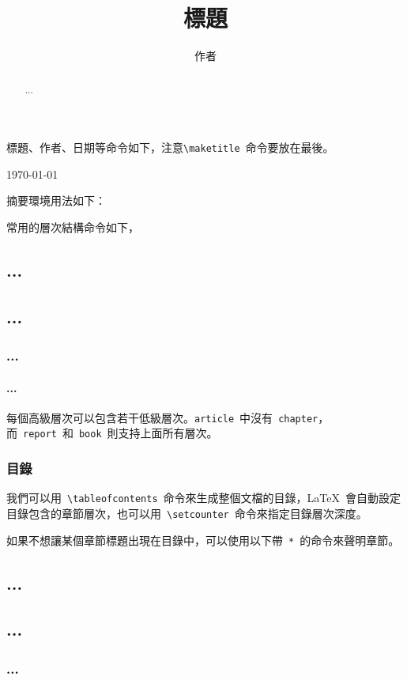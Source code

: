 標題、作者、日期等命令如下，注意\verb|\maketitle|~命令要放在最後。
\begin{code}
\title{標題}
\author{作者}
\today
\maketitle
\end{code}

摘要環境用法如下：
\begin{code}
\begin{abstract}
...
\end{abstract}
\end{code}

常用的層次結構命令如下，
\begin{code}
\chapter{...}
\section{...}
\subsection{...}
\subsubsection{...}
\end{code}

每個高級層次可以包含若干低級層次。\verb|article|~中沒有~\verb|chapter|，而~\verb|report|~和~\verb|book|~則支持上面所有層次。

\subsection{目錄}

我們可以用~\verb|\tableofcontents|~命令來生成整個文檔的目錄，\LaTeX~會自動設定目錄包含的章節層次，也可以用~\verb|\setcounter|~命令來指定目錄層次深度。
\begin{code}
\tableofcontents
\setcounter{tocdepth}{2}
\end{code}

如果不想讓某個章節標題出現在目錄中，可以使用以下帶~\verb|*|~的命令來聲明章節。
\begin{code}
\chapter*{...}
\section*{...}
\subsection*{...}
\end{code}

